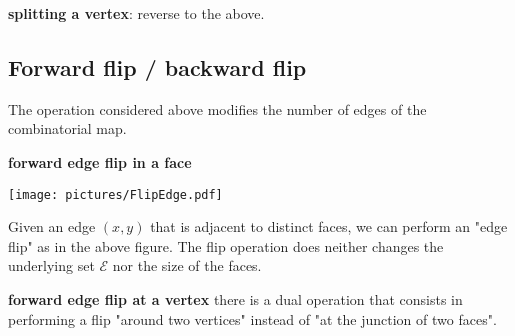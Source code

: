 \documentclass[a4paper,12pt]{article}
\def\cE{\mathcal{E}}
\begin{document}
\noindent\textbf{splitting a vertex}:
reverse to the above.

\subsection{Forward flip / backward flip}
The operation considered above modifies the number of edges of the combinatorial map.

\noindent\textbf{forward edge flip in a face}
\begin{center}\texttt{[image: pictures/FlipEdge.pdf]}\end{center}
Given an edge $(x,y)$ that is adjacent to distinct faces, we can perform an
"edge flip" as in the above figure.
The flip operation does neither changes the underlying set $\cE$ nor the size of the faces.

\smallskip

\noindent\textbf{forward edge flip at a vertex} there is a dual operation that consists in
performing a flip "around two vertices" instead of "at the junction of two faces".

\bigskip
\end{document}
